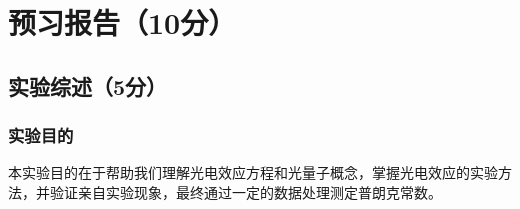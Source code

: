 \documentclass[]{../../templates/Report}%
\begin{document}
\maketitle%

\section{预习报告（10分）}

\subsection{实验综述（5分）}
\subsubsection{实验目的}
本实验目的在于帮助我们理解光电效应方程和光量子概念，掌握光电效应的实验方法，并验证亲自实验现象，最终通过一定的数据处理测定普朗克常数。
\end{document}
